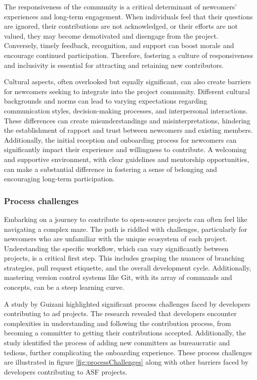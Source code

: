 The responsiveness of the community is a critical determinant of newcomers' experiences and long-term engagement. When individuals feel that their questions are ignored, their contributions are not acknowledged, or their efforts are not valued, they may become demotivated and disengage from the project. Conversely, timely feedback, recognition, and support can boost morale and encourage continued participation. Therefore, fostering a culture of responsiveness and inclusivity is essential for attracting and retaining new contributors.

Cultural aspects, often overlooked but equally significant, can also create barriers for newcomers seeking to integrate into the project community. Different cultural backgrounds and norms can lead to varying expectations regarding communication styles, decision-making processes, and interpersonal interactions. These differences can create misunderstandings and misinterpretations, hindering the establishment of rapport and trust between newcomers and existing members. Additionally, the initial reception and onboarding process for newcomers can significantly impact their experience and willingness to contribute. A welcoming and supportive environment, with clear guidelines and mentorship opportunities, can make a substantial difference in fostering a sense of belonging and encouraging long-term participation.


\subsubsection{Process challenges}

Embarking on a journey to contribute to open-source projects can often feel like navigating a complex maze. The path is riddled with challenges, particularly for newcomers who are unfamiliar with the unique ecosystem of each project. Understanding the specific workflow, which can vary significantly between projects, is a critical first step. This includes grasping the nuances of branching strategies, pull request etiquette, and the overall development cycle. Additionally, mastering version control systems like Git, with its array of commands and concepts, can be a steep learning curve.

A study by Guizani \cite{04guizani2021long} highlighted significant process challenges faced by developers contributing to \ac{asf} projects. The research revealed that developers encounter complexities in understanding and following the contribution process, from becoming a committer to getting their contributions accepted. Additionally, the study identified the process of adding new committers as bureaucratic and tedious, further complicating the onboarding experience. These process challenges are illustrated in figure \ref{fig:processChallenges} along with other barriers faced by developers contributing to ASF projects.

